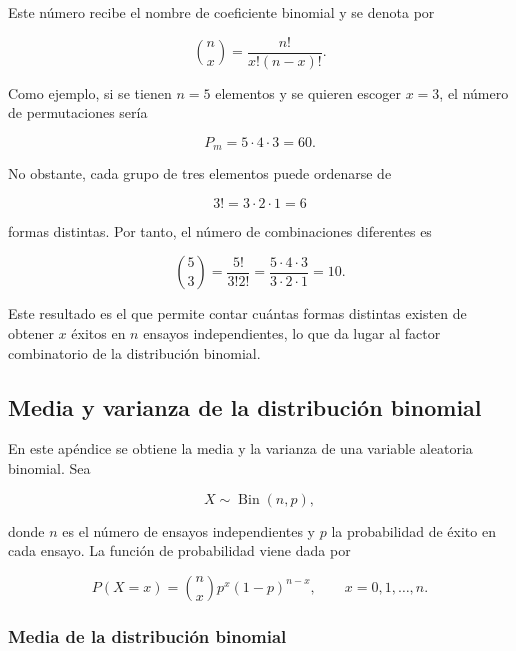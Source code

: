 \documentclass[12pt,a4paper]{article}
\begin{document}
Este número recibe el nombre de coeficiente binomial y se denota por

\begin{equation}
    \binom{n}{x}
    =
    \frac{n!}{x!(n-x)!}.
    \label{eq:ap_coeficiente_binomial}
\end{equation}

Como ejemplo, si se tienen $n=5$ elementos y se quieren escoger $x=3$, el número de permutaciones sería

\begin{equation}
    P_m=5\cdot4\cdot3=60.
\end{equation}

No obstante, cada grupo de tres elementos puede ordenarse de

\begin{equation}
    3!=3\cdot2\cdot1=6
\end{equation}

formas distintas. Por tanto, el número de combinaciones diferentes es

\begin{equation}
    \binom{5}{3}
    =
    \frac{5!}{3!2!}
    =
    \frac{5\cdot4\cdot3}{3\cdot2\cdot1}
    =
    10.
\end{equation}

Este resultado es el que permite contar cuántas formas distintas existen de obtener $x$ éxitos en $n$ ensayos independientes, lo que da lugar al factor combinatorio de la distribución binomial.

\subsection{Media y varianza de la distribución binomial}
\label{ap:momentos_binomial}

En este apéndice se obtiene la media y la varianza de una variable aleatoria binomial. Sea

\begin{equation}
    X\sim \operatorname{Bin}(n,p),
\end{equation}

donde $n$ es el número de ensayos independientes y $p$ la probabilidad de éxito en cada ensayo. La función de probabilidad viene dada por

\begin{equation}
    P(X=x)=\binom{n}{x}p^x(1-p)^{n-x},
    \qquad x=0,1,\ldots,n.
    \label{eq:ap_binomial}
\end{equation}


\subsubsection{Media de la distribución binomial}
\label{ap:media_binomial}
\end{document}
